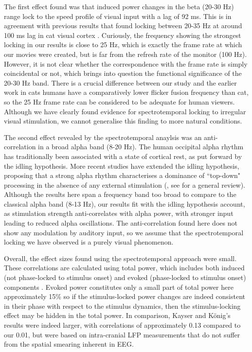 The first effect found was that induced power changes in the beta (20-30
Hz) range lock to the speed profile of visual input with a lag of 92 ms.
This is in agreement with previous results that found locking between 20-35
Hz at around 100 ms lag in cat visual cortex \citep{kayser2004b}.
Curiously, the frequency showing the strongest locking in our results is
close to 25 Hz, which is exactly the frame rate at which our movies were
created, but is far from the refresh rate of the monitor (100 Hz).
However, it is not clear whether the correspondence with the frame rate is
simply coincidental or not, which brings into question the functional
significance of the 20-30 Hz band. There is a crucial difference between
our study and the earlier work in cats \textemdash humans have a
comparatively lower flicker fusion frequency than cat, so the 25 Hz frame
rate can be considered to be adequate for human viewers. Although we have
clearly found evidence for spectrotemporal locking to irregular visual
stimulation, we cannot generalise this finding to more natural conditions. 



The second effect revealed by the spectrotemporal anaylsis was an
anti-correlation in a broad alpha band (8-20 Hz). The human occipital alpha
rhythm has traditionally been associated with a state of cortical rest, as
put forward by the idling hypothesis. More recent studies have extended the
idling hypothesis, proposing that a strong alpha rhythm characterises a
dominance of ``top-down" processing in the absence of any external
stimulation (\cite{stein2000a}, see \cite{palva2007a} for a general
review).  Although the results here span a frequency band too broad to
compare to the classical alpha band (8-13 Hz), our results fit with the
idling hypothesis account, as stimulation strength anti-correlates with
alpha power, with stronger input leading to reduced alpha oscillations. The
anti-correlation found here does not show any modulation by auditory input,
so we assume that the spectrotemporal locking we have observed is a purely
visual phenomenon.



Overall, the effect sizes found using the spectrotemporal approach were
small. These correlations are calculated using total power, which includes
both induced (not phase-locked to stimulus onset) and evoked (phase-locked
to stimulus onset) components \citep{tallon-baudry1999a}.  Evoked power
constitutes only a small part of total power \textemdash here approximately
15\% \textemdash so if the stimulus-locked power changes are indeed
consistent in their phase with respect to the stimulus dynamics, then the
stimulus-locking effect may be hidden in the total power. In comparison,
Kayser and K\"onig's  results were indeed larger, with correlations of
approximately 0.13 compared to our 0.01, but were based on intra-cranial
LFP measurements that do not suffer from the spatial smearing inherent in
EEG. 




